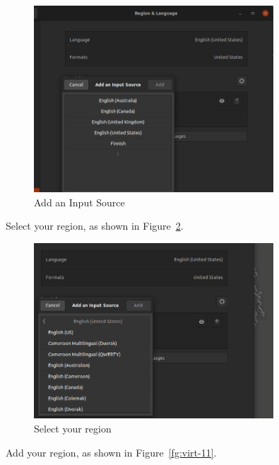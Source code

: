 \begin{figure}[H]
\begin{center}
\includegraphics[width=0.8\textwidth]{virt-9}
\caption{Add an Input Source}\label{fg:virt-9}
\end{center}
\end{figure}

\newpage

Select your region, as shown in Figure~\ref{fg:virt-10}.

\begin{figure}[H]
\begin{center}
\includegraphics[width=0.8\textwidth]{virt-10}
\caption{Select your region}\label{fg:virt-10}
\end{center}
\end{figure}

Add your region, as shown in Figure~\ref{fg:virt-11}.

